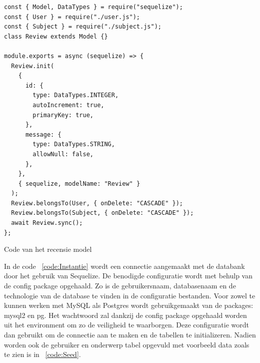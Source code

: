 \begin{listing}[H]
  \centering
  \begin{verbatim}
const { Model, DataTypes } = require("sequelize");
const { User } = require("./user.js");
const { Subject } = require("./subject.js");
class Review extends Model {}

module.exports = async (sequelize) => {
  Review.init(
    {
      id: {
        type: DataTypes.INTEGER,
        autoIncrement: true,
        primaryKey: true,
      },
      message: {
        type: DataTypes.STRING,
        allowNull: false,
      },
    },
    { sequelize, modelName: "Review" }
  );
  Review.belongsTo(User, { onDelete: "CASCADE" });
  Review.belongsTo(Subject, { onDelete: "CASCADE" });
  await Review.sync();
};
\end{verbatim}
\caption{\label{code:Review}Code van het recensie model}
\end{listing}

In de code ~\ref{code:Instantie} wordt een connectie aangemaakt met de databank door het gebruik van Sequelize. 
De benodigde configuratie wordt met behulp van de config package opgehaald. Zo is de 
gebruikersnaam, databasenaam en de technologie van de database te vinden in de configuratie bestanden.
Voor zowel te kunnen werken met MySQL als Postgres wordt gebruikgemaakt van de packages: mysql2 en pg.
Het wachtwoord zal dankzij de config package opgehaald worden uit het environment om zo de veiligheid te waarborgen.
Deze configuratie wordt dan gebruikt om de connectie aan te maken en de tabellen te initializeren.
Nadien worden ook de gebruiker en onderwerp tabel opgevuld met voorbeeld data zoals te zien is in ~\ref{code:Seed}.

